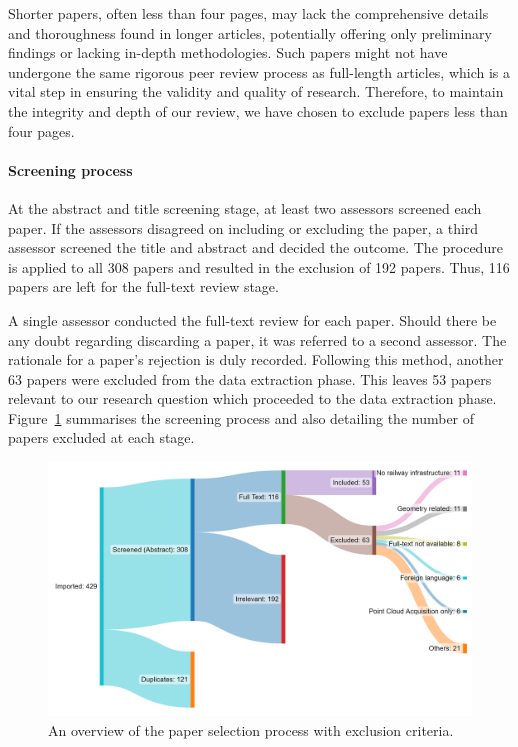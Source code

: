 Shorter papers, often less than four pages, may lack the comprehensive details and thoroughness found in longer articles, potentially offering only preliminary findings or lacking in-depth methodologies. Such papers might not have undergone the same rigorous peer review process as full-length articles, which is a vital step in ensuring the validity and quality of research. Therefore, to maintain the integrity and depth of our review, we have chosen to exclude papers less than four pages.\\

\paragraph{Screening process}
At the abstract and title screening stage, at least two assessors screened each paper. If the assessors disagreed on including or excluding the paper, a third assessor screened the title and abstract and decided the outcome. The procedure is applied to all 308 papers and resulted in the exclusion of 192 papers. Thus, 116 papers are left for the full-text review stage. 

A single assessor conducted the full-text review for each paper. Should there be any doubt regarding discarding a paper, it was referred to a second assessor. The rationale for a paper's rejection is duly recorded. Following this method, another 63 papers were excluded from the data extraction phase. This leaves 53 papers relevant to our research question which proceeded to the data extraction phase. Figure~\ref{fig:stoa:prisma} summarises the screening process and also detailing the number of papers excluded at each stage. 
\begin{figure}
    \centering
    \includegraphics[width=0.95\linewidth]{./Chapters/stoa/fig/PrismaDiagram.png}
    \caption{An overview of the paper selection process with exclusion criteria.} 
    \label{fig:stoa:prisma}
\end{figure}

